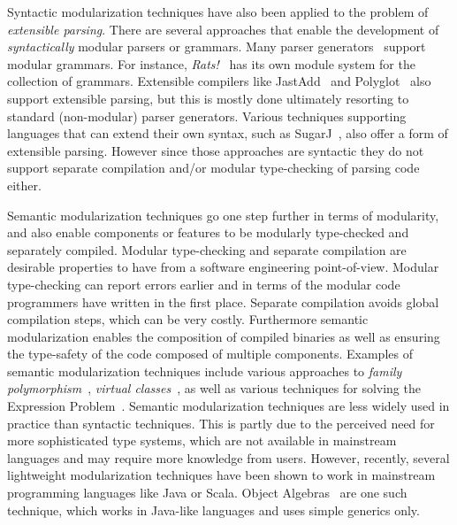 Syntactic modularization techniques have also been applied to the
problem of \emph{extensible parsing}. There are several approaches
that enable the development of \emph{syntactically} modular parsers or
grammars. Many parser
generators~\cite{antlr1995,Grimm2006,Gouseti2014,Warth2016} support
modular grammars. For instance, \textit{Rats!}~\cite{Grimm2006} has
its own module system for the collection of grammars.  Extensible
compilers like JastAdd~\cite{Ekman2007} and
Polyglot~\cite{Nystrom2003} also support extensible parsing, but this
is mostly done ultimately resorting to standard (non-modular) parser
generators. Various techniques supporting languages that can extend
their own syntax, such as SugarJ~\cite{Erdweg2011}, also offer a form
of extensible parsing. However since those approaches are syntactic
they do not support separate compilation and/or modular type-checking
of parsing code either.

Semantic modularization techniques go one step further in terms of modularity,
and also enable components or features to be modularly type-checked
and separately compiled. Modular type-checking and separate
compilation are desirable properties to have from a software
engineering point-of-view. Modular type-checking can report errors
earlier and in terms of the modular code programmers have written
in the first place. Separate compilation avoids global compilation
steps, which can be very costly. Furthermore semantic modularization
enables the composition of compiled binaries as well as ensuring the
type-safety of the code composed of multiple components. Examples of semantic modularization techniques
include various approaches to \emph{family polymorphism}~\cite{ernst01FP},
\emph{virtual classes}~\cite{Ernst:2006}, as
well as various techniques for solving the Expression
Problem~\cite{Oliveira:2012,wang2016expression,torgersen2004expression,odersky2005independently}.
Semantic modularization techniques are less widely used in practice
than syntactic techniques. This is partly due to the perceived need for more
sophisticated type systems, which are not available in mainstream
languages and may require more knowledge from users. However, recently,
several lightweight modularization techniques have been shown to work
in mainstream programming languages like Java or Scala. Object
Algebras~\cite{Oliveira:2012} are one such technique, which works in
Java-like languages and uses simple generics only.

